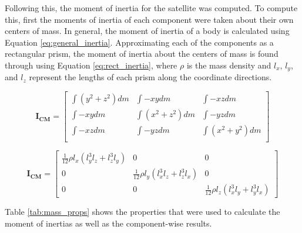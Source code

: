 Following this, the moment of inertia for the satellite was computed. To compute this, first the moments of inertia of each component were taken about their own centers of mass. In general, the moment of inertia of a body is calculated using Equation \ref{eq:general_inertia}. Approximating each of the components as a rectangular prism, the moment of inertia about the centers of mass is found through using Equation \ref{eq:rect_inertia}, where $\rho$ is the mass density and $l_x$, $l_y$, and $l_z$ represent the lengths of each prism along the coordinate directions.

\begin{equation} \label{eq:general_inertia}
    \boldsymbol{I_{CM}} = \left[ \begin{array}{ccc}
     \int{(y^2 + z^2)}dm & \int{-  xy}dm & \int{-  xz}dm \\
\int{-  xy}dm &   \int{(x^2 + z^2)}dm & \int{-  yz}dm \\
\int{-  xz}dm & \int{-  yz}dm &  \int{(x^2 + y^2)}dm \\
    \end{array} \right]
\end{equation}

\begin{equation} \label{eq:rect_inertia}
    \boldsymbol{I_{CM}} = \left[ \begin{array}{ccc}
       \frac{1}{12}\rho l_x \left( l_y^3 l_z + l_z^3 l_y \right)  & 0 & 0 \\
         0  & \frac{1}{12}\rho l_y \left( l_x^3 l_z + l_z^3 l_x \right) & 0 \\
         0  & 0 &  \frac{1}{12}\rho l_z \left( l_x^3 l_y + l_y^3 l_x \right)
         \end{array} \right]
\end{equation}

Table \ref{tab:mass_props} shows the properties that were used to calculate the moment of inertias as well as the component-wise results. 

